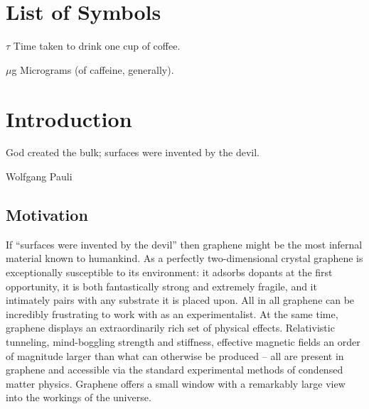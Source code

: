 \documentclass[edeposit,fullpage,draftthesis]{uiucthesis2009}
\begin{document}
\chapter{List of Symbols}

\begin{symbollist}[0.7in]
\item[$\tau$] Time taken to drink one cup of coffee.
\item[$\mu$g] Micrograms (of caffeine, generally).
\end{symbollist}

\mainmatter
\chapter{Introduction}

   \epigraph{God created the bulk; surfaces were invented by the devil.}{Wolfgang Pauli}
   
   
%    

    \section{Motivation}
    
    If ``surfaces were invented by the devil'' then graphene might be the most infernal
    material known to humankind. As a perfectly two-dimensional crystal graphene is exceptionally 
    susceptible to its environment: it adsorbs dopants at the first opportunity, it is both
    fantastically strong and extremely fragile, and it intimately pairs with any substrate it is placed upon.
    All in all graphene can be incredibly frustrating to work with as an experimentalist. 
    At the same time, graphene displays an extraordinarily rich set of physical effects.
    Relativistic tunneling, mind-boggling strength and stiffness,
    effective magnetic fields an order of magnitude larger than what can otherwise be produced -- 
    all are present in graphene and accessible via the standard experimental methods of condensed matter physics.
    Graphene offers a small window with a remarkably large view into the workings of the universe.
    
\end{document}
